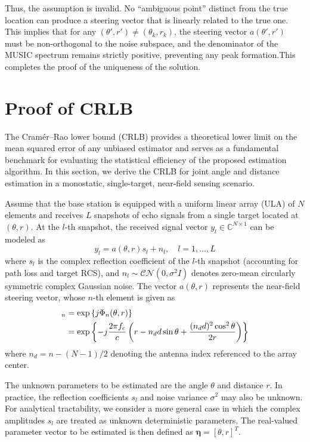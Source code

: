 \documentclass[lettersize,journal]{IEEEtran}
\begin{document}
{Thus, the assumption is invalid. No “ambiguous point” distinct from the true location can produce a steering vector that is linearly related to the true one. This implies that for any $(\theta', r') \neq (\theta_k, r_k)$, the steering vector $a(\theta', r')$ must be non-orthogonal to the noise subspace, and the denominator of the MUSIC spectrum remains strictly positive, preventing any peak formation.This completes the proof of the uniqueness of the solution.

\section{Proof of CRLB}
\label{appendix:crlb}
The Cramér–Rao lower bound (CRLB) provides a theoretical lower limit on the mean squared error of any unbiased estimator and serves as a fundamental benchmark for evaluating the statistical efficiency of the proposed estimation algorithm. In this section, we derive the CRLB for joint angle and distance estimation in a monostatic, single-target, near-field sensing scenario.

Assume that the base station is equipped with a uniform linear array (ULA) of $N$ elements and receives $L$ snapshots of echo signals from a single target located at $(\theta, r)$. At the $l$-th snapshot, the received signal vector $y_l \in \mathbb{C}^{N \times 1}$ can be modeled as
\begin{equation}
	y_l = a(\theta, r)s_l + n_l, \quad l=1, \dots, L
\end{equation}
where $s_l$ is the complex reflection coefficient of the $l$-th snapshot (accounting for path loss and target RCS), and $n_l \sim \mathcal{CN}(0, \sigma^2 I)$ denotes zero-mean circularly symmetric complex Gaussian noise. The vector $a(\theta, r)$ represents the near-field steering vector, whose $n$-th element is given as
\begin{align}
    [a(\theta, r)]_n &= \exp\left\{j \Phi_n(\theta, r)\right\} \notag \\
    &= \exp\left\{-j\frac{2\pi f_c}{c}\left(r - n_d d \sin\theta + \frac{(n_d d)^2 \cos^2\theta}{2r}\right)\right\}
\end{align}
where $n_d = n - (N-1)/2$ denoting the antenna index referenced to the array center.

The unknown parameters to be estimated are the angle $\theta$ and distance $r$. In practice, the reflection coefficients $s_l$ and noise variance $\sigma^2$ may also be unknown. For analytical tractability, we consider a more general case in which the complex amplitudes $s_l$ are treated as unknown deterministic parameters. The real-valued parameter vector to be estimated is then defined as $\boldsymbol{\eta} = [\theta, r]^T$.

}
\end{document}
